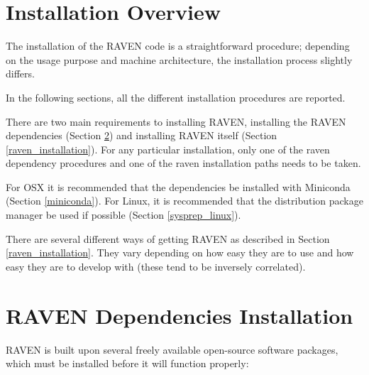 \section{Installation Overview}

The installation of the RAVEN code is a straightforward procedure;
depending on the usage purpose and machine architecture, the
installation process slightly differs.

In the following sections, all the different installation procedures
are reported.

There are two main requirements to installing RAVEN, installing the
RAVEN dependencies (Section \ref{raven_dependencies}) and installing
RAVEN itself (Section \ref{raven_installation}).  For any particular
installation, only one of the raven dependency procedures and one of
the raven installation paths needs to be taken.

For OSX it is recommended that the dependencies be installed with
Miniconda (Section \ref{miniconda}).  For Linux, it is recommended
that the distribution package manager be used if possible (Section
\ref{sysprep_linux}).

There are several different ways of getting RAVEN as described in
Section \ref{raven_installation}.  They vary depending on how easy
they are to use and how easy they are to develop with (these tend to
be inversely correlated).

\newcommand{\goToRavenInstallation}{Now go on to Section \ref{raven_installation} for Raven installation.
}


\section{RAVEN Dependencies Installation}
\label{raven_dependencies}

RAVEN is built upon several freely available open-source software packages,
which must  be installed before it will function properly:

